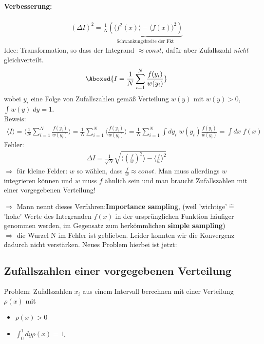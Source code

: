 \documentclass[12pt]{article}
\begin{document}
\paragraph{Verbesserung:}
\begin{align}
(\Delta I )^2 = \frac{1}{N} \underbrace{\left( \langle f^2(x) \rangle - \langle f(x)\rangle^2 \right)}_\text{Schwankungsbreite der Fkt}
\end{align}
Idee: Transformation, so dass der Integrand $\approx const$, dafür aber Zufallszahl \textit{nicht} gleichverteilt.
\begin{align}
\Aboxed{ I= \frac{1}{N} \sum_{i=1}^N \frac{f(y_i)}{w(y_i)} }
\end{align}
wobei $y_i$ eine Folge von Zufallszahlen gemäß Verteilung $w(y)$ mit $w(y)>0$, $\int w(y) \; dy=1$. \\
Beweis:
\begin{align}
\langle I\rangle = \langle \frac{1}{N} \sum_{i=1}^N \frac{f(y_i)}{w(y_i)} \rangle = \frac{1}{N} \sum_{i=1}^N \langle \frac{f(y_i)}{w(y_i)} \rangle = \frac{1}{N} \sum_{i=1}^N \int dy_i \; w(y_i)  \frac{f(y_i)}{w(y_i)} 
= \int dx \; f(x)
\end{align}
Fehler: \begin{align}
\Delta I=\frac{1}{\sqrt{N}}
 \sqrt{\langle \left(\frac{f}{w}\right)^2 \rangle - \langle \frac{f}{w} \rangle ^2}
 \end{align}
 $\Rightarrow$ für kleine Felder: $w$ so wählen, dass $\frac{f}{w} \approx const.$ Man muss allerdings $w$ integrieren können und $w$ muss $f$ ähnlich sein und man braucht Zufallszahlen mit einer vorgegebenen Verteilung! %
 
 $\Rightarrow$ Mann nennt dieses Verfahren:\textbf{Importance sampling}, (weil 'wichtige'$\widehat{=}$ 'hohe' Werte des Integranden $f(x)$ in der ursprünglichen Funktion häufiger genommen werden, im Gegensatz zum herkömmlichen \textbf{simple sampling})\\ $\Rightarrow$ die Wurzel N im Fehler ist geblieben. Leider konnten wir die Konvergenz dadurch nicht verstärken. Neues Problem hierbei ist jetzt: 
 
 \subsection{Zufallszahlen einer vorgegebenen Verteilung}
 Problem: %
 Zufallszahlen $x_i$ aus einem Intervall berechnen mit einer Verteilung $\rho(x)$ mit
 \begin{itemize}
 \item $\rho(x)>0$
 \item $\int_0^1 dy \rho(x)=1$.
\end{itemize} 
 
\end{document}
